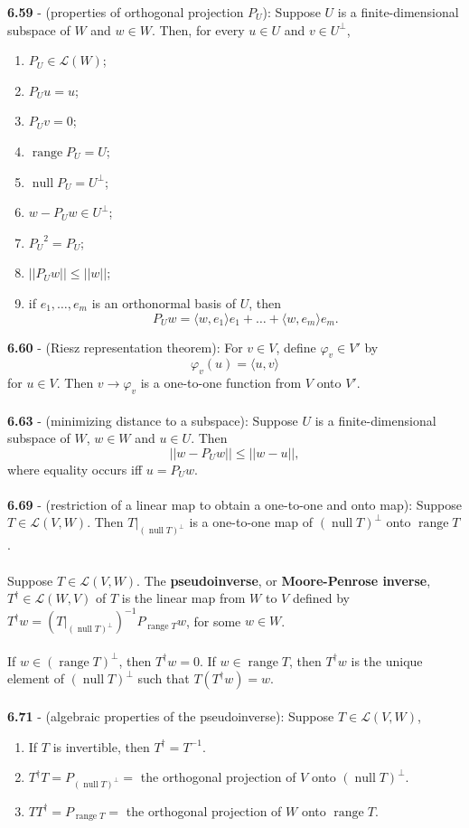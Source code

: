 \documentclass{article}
\DeclareMathOperator{\Null}{null}
\DeclareMathOperator{\Range}{range}
\theoremstyle{definition}
\begin{document}
\textbf{6.59} - (properties of orthogonal projection $P_U$): Suppose $U$ is a finite-dimensional subspace of $W$ and $w \in W$. Then, for every $u \in U$ and $v \in U^{\perp}$, \begin{enumerate}
    \item $P_U \in \mathcal{L}(W)$;
    \item $P_U u = u$;
    \item $P_U v = 0$;
    \item $\Range{P_U} = U$;
    \item $\Null{P_U} = U^{\perp}$;
    \item $w - P_U w \in U^{\perp}$;
    \item ${P_U}^2 = P_U$;
    \item $||P_U w|| \leq ||w||$;
    \item if $e_1, \dots, e_m$ is an orthonormal basis of $U$, then $$P_U w = \langle w, e_1 \rangle e_1 + \dots + \langle w, e_m \rangle e_m.$$
\end{enumerate} $ $ \\
\textbf{6.60} - (Riesz representation theorem): For $v \in V$, define $\varphi_v \in V'$ by $$\varphi_v(u) = \langle u, v \rangle$$ for $u \in V$. Then $v \rightarrow \varphi_v$ is a one-to-one function from $V$ onto $V'$. \\ \\
\textbf{6.63} - (minimizing distance to a subspace): Suppose $U$ is a finite-dimensional subspace of $W$, $w \in W$ and $u \in U$. Then $$||w - P_U w|| \leq ||w - u||,$$ where equality occurs iff $u = P_U w$. \\ \\
\textbf{6.69} - (restriction of a linear map to obtain a one-to-one and onto map): Suppose $T \in \mathcal{L}(V, W)$. Then $T|_{(\Null{T})^{\perp}}$ is a one-to-one map of $(\Null{T})^{\perp}$ onto $\Range{T}$. \\ \\
Suppose $T \in \mathcal{L}(V, W)$. The \textbf{pseudoinverse}, or \textbf{Moore-Penrose inverse}, $T^\dagger \in \mathcal{L}(W, V)$ of $T$ is the linear map from $W$ to $V$ defined by $T^\dagger w = (T|_{(\Null{T})^\perp})^{-1}P_{\Range{T}}w$, for some $w \in W$. \\ \\
If $w \in (\Range{T})^\perp$, then $T^\dagger w = 0$. If $w \in \Range{T}$, then $T^\dagger w$ is the unique element of $(\Null{T})^\perp$ such that $T(T^\dagger w) = w$. \\ \\
\textbf{6.71} - (algebraic properties of the pseudoinverse): Suppose $T \in \mathcal{L}(V, W)$, \begin{enumerate}
    \item If $T$ is invertible, then $T^\dagger = T^{-1}$.
    \item $T^\dagger T = P_{(\Null{T})^\perp} = $ the orthogonal projection of $V$ onto $(\Null{T})^\perp$.
    \item $TT^\dagger = P_{\Range{T}} = $ the orthogonal projection of $W$ onto $\Range{T}$.
\end{enumerate} $ $ \\
\end{document}

